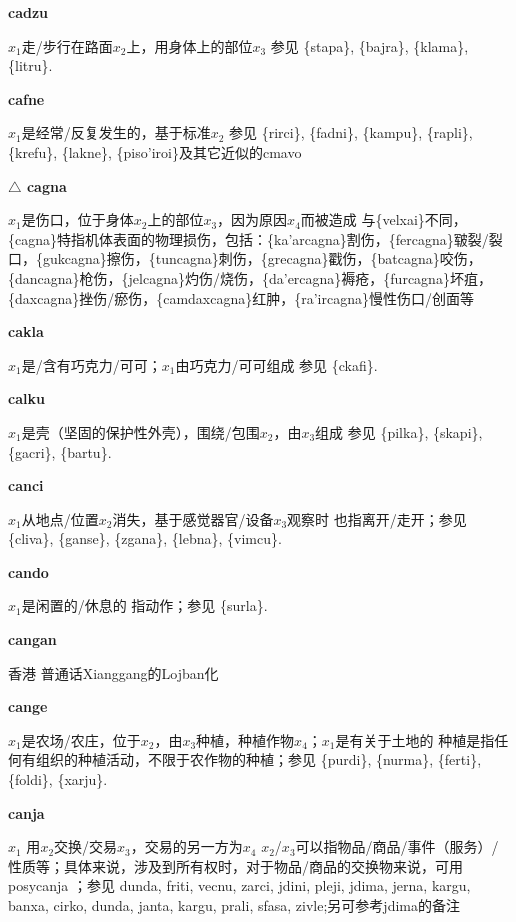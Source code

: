 \documentclass[notitlepage,twocolumn,a4paper,10pt]{book}
\begin{document}
{\sffamily\bfseries cadzu}\enspace {\ttfamily\bfseries[    dzu]}  $x_1$走\slash{}步行在路面$x_2$上，用身体上的部位$x_3$ \textemdash{} 参见 \{stapa\}, \{bajra\}, \{klama\}, \{litru\}.

{\sffamily\bfseries cafne}\enspace {\ttfamily\bfseries[caf]}  $x_1$是经常\slash{}反复发生的，基于标准$x_2$ \textemdash{} 参见 \{rirci\}, \{fadni\}, \{kampu\}, \{rapli\}, \{krefu\}, \{lakne\}, \{piso'iroi\}及其它近似的cmavo

{\sffamily\bfseries $\triangle$ cagna} $x_1$是伤口，位于身体$x_2$上的部位$x_3$，因为原因$x_4$而被造成 \textemdash{} 与\{velxai\}不同，\{cagna\}特指机体表面的物理损伤，包括：\{ka'arcagna\}割伤，\{fercagna\}皲裂\slash{}裂口，\{gukcagna\}擦伤，\{tuncagna\}刺伤，\{grecagna\}戳伤，\{batcagna\}咬伤，\{dancagna\}枪伤，\{jelcagna\}灼伤\slash{}烧伤，\{da'ercagna\}褥疮，\{furcagna\}坏疽，\{daxcagna\}挫伤\slash{}瘀伤，\{camdaxcagna\}红肿，\{ra'ircagna\}慢性伤口\slash{}创面等

{\sffamily\bfseries cakla} $x_1$是\slash{}含有巧克力\slash{}可可；$x_1$由巧克力\slash{}可可组成 \textemdash{} 参见 \{ckafi\}.

{\sffamily\bfseries calku}\enspace {\ttfamily\bfseries[cak]}  $x_1$是壳（坚固的保护性外壳），围绕\slash{}包围$x_2$，由$x_3$组成 \textemdash{} 参见 \{pilka\}, \{skapi\}, \{gacri\}, \{bartu\}.

{\sffamily\bfseries canci} $x_1$从地点\slash{}位置$x_2$消失，基于感觉器官\slash{}设备$x_3$观察时 \textemdash{} 也指离开\slash{}走开；参见 \{cliva\}, \{ganse\}, \{zgana\}, \{lebna\}, \{vimcu\}.

{\sffamily\bfseries cando}\enspace {\ttfamily\bfseries[cad]}  $x_1$是闲置的\slash{}休息的 \textemdash{} 指动作；参见 \{surla\}.

{\sffamily\bfseries cangan} 香港 \textemdash{} 普通话Xianggang的Lojban化

{\sffamily\bfseries cange}\enspace {\ttfamily\bfseries[cag]}  $x_1$是农场\slash{}农庄，位于$x_2$，由$x_3$种植，种植作物$x_4$；$x_1$是有关于土地的 \textemdash{} 种植是指任何有组织的种植活动，不限于农作物的种植；参见 \{purdi\}, \{nurma\}, \{ferti\}, \{foldi\}, \{xarju\}.

{\sffamily\bfseries canja}\enspace {\ttfamily\bfseries[caj]}  $x_1$ 用$x_2$交换\slash{}交易$x_3$，交易的另一方为$x_4$ \textemdash{} $x_2$\slash{}$x_3$可以指物品\slash{}商品\slash{}事件（服务）\slash{}性质等；具体来说，涉及到所有权时，对于物品\slash{}商品的交换物来说，可用 {posycanja} ；参见 {dunda}, {friti}, {vecnu}, {zarci}, {jdini}, {pleji}, {jdima}, {jerna}, {kargu}, {banxa}, {cirko}, {dunda}, {janta}, {kargu}, {prali}, {sfasa}, {zivle};另可参考{jdima}的备注
\end{document}

